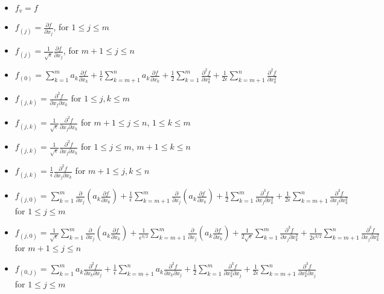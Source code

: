 \documentclass[12pt]{article}
\begin{document}
\begin{itemize}
\item $f_v = f$
%
\item $f_{(j)} = \frac{\partial f}{\partial x_j}$, for $1 \le j \le m$
\item $f_{(j)} = \frac{1}{\sqrt{\epsilon}} \frac{\partial f}{\partial x_j}$, for $m+1 \le j \le n$
%
\item $f_{(0)} = \sum_{k=1}^m a_k \frac{\partial f}{\partial x_k} 
+ \frac{1}{\epsilon} \sum_{k=m+1}^n a_k \frac{\partial f}{\partial x_k} 
+ \frac{1}{2} \sum_{k=1}^m \frac{\partial^2 f}{\partial x_k^2}
+ \frac{1}{2 \epsilon} \sum_{k=m+1}^n \frac{\partial^2 f}{\partial x_k^2}$
%
\item $f_{(j, k)} =  \frac{\partial^2 f}{\partial x_j \partial x_k}  $ for $1 \le j,k \le m$
\item $f_{(j, k)} =  \frac{1}{\sqrt{\epsilon}} \frac{\partial^2 f}{\partial x_j \partial x_k} $ for $m+1 \le j \le n$, $1 \le k \le m$
\item $f_{(j, k)} =  \frac{1}{\sqrt{\epsilon}} \frac{\partial^2 f}{\partial x_j \partial x_k} $ for $1 \le j \le m$, $ m+1 \le k \le n$
\item $f_{(j, k)} =  \frac{1}{\epsilon} \frac{\partial^2 f}{\partial x_j \partial x_k} $ for $m+1 \le j,k \le n$
%
\item $f_{(j,0)} = \sum_{k=1}^m \frac{\partial }{\partial x_j} \left( a_k \frac{\partial f}{\partial x_k} \right) + \frac{1}{\epsilon} \sum_{k=m+1}^m \frac{\partial }{\partial x_j} \left( a_k \frac{\partial f}{\partial x_k} \right) + \frac{1}{2} \sum_{k=1}^m \frac{\partial^3 f}{\partial x_j \partial x_k^2} + \frac{1}{2 \epsilon} \sum_{k=m+1}^n \frac{\partial^3 f}{\partial x_j \partial x_k^2} $ for $1 \le j \le m$
\item $f_{(j,0)} = \frac{1}{\sqrt{\epsilon}} \sum_{k=1}^m \frac{\partial }{\partial x_j} \left( a_k \frac{\partial f}{\partial x_k} \right) + \frac{1}{\epsilon^{3/2}} \sum_{k=m+1}^m \frac{\partial }{\partial x_j} \left( a_k \frac{\partial f}{\partial x_k} \right) + \frac{1}{2 \sqrt{\epsilon}} \sum_{k=1}^m \frac{\partial^3 f}{\partial x_j \partial x_k^2} + \frac{1}{2 \epsilon^{3/2}} \sum_{k=m+1}^n \frac{\partial^3 f}{\partial x_j \partial x_k^2} $ for $m+1 \le j \le n$
%
\item $f_{(0, j)} = \sum_{k=1}^m a_k \frac{\partial^2 f}{\partial x_k \partial x_j} 
+ \frac{1}{\epsilon} \sum_{k=m+1}^n a_k \frac{\partial^2 f}{\partial x_k \partial x_j} 
 + \frac{1}{2} \sum_{k=1}^m \frac{\partial^3 f}{\partial x_k^2 \partial x_j} 
 +\frac{1}{2 \epsilon} \sum_{k=m+1}^n \frac{\partial^3 f}{\partial x_k^2 \partial x_j}$ for $1 \le j \le m$

\end{itemize}
\end{document}
